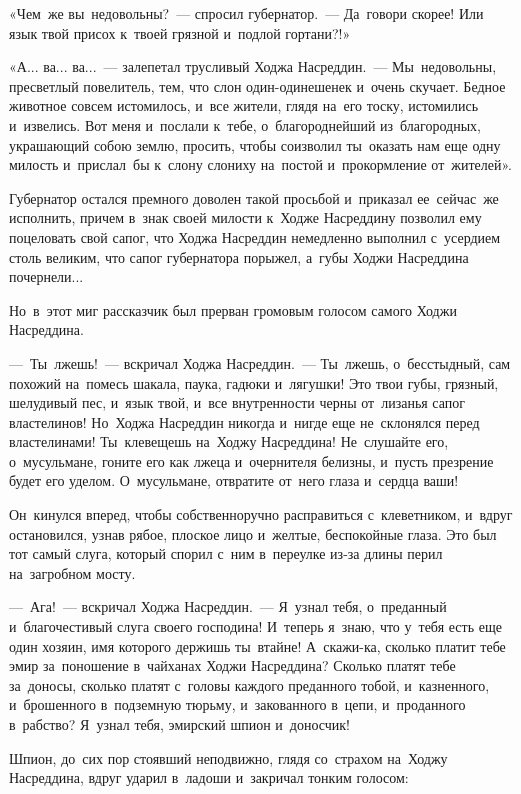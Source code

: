 \documentclass[12pt,a4paper]{book}
\begin{document}
«Чем~же вы~недовольны?~— спросил губернатор.~— Да~говори скорее! Или язык твой присох к~твоей грязной и~подлой гортани?!»

«А... ва... ва...~— залепетал трусливый Ходжа Насреддин.~— Мы~недовольны, пресветлый повелитель, тем, что слон один-одинешенек и~очень скучает. Бедное животное совсем истомилось, и~все жители, глядя на~его тоску, истомились и~извелись. Вот меня и~послали к~тебе, о~благороднейший из~благородных, украшающий собою землю, просить, чтобы соизволил ты~оказать нам еще одну милость и~прислал~бы к~слону слониху на~постой и~прокормление от~жителей».

Губернатор остался премного доволен такой просьбой и~приказал ее~сейчас~же исполнить, причем в~знак своей милости к~Ходже Насреддину позволил ему поцеловать свой сапог, что Ходжа Насреддин немедленно выполнил с~усердием столь великим, что сапог губернатора порыжел, а~губы Ходжи Насреддина почернели...

Но~в~этот миг рассказчик был прерван громовым голосом самого Ходжи Насреддина.

—~Ты~лжешь!~— вскричал Ходжа Насреддин.~— Ты~лжешь, о~бесстыдный, сам похожий на~помесь шакала, паука, гадюки и~лягушки! Это твои губы, грязный, шелудивый пес, и~язык твой, и~все внутренности черны от~лизанья сапог властелинов! Но~Ходжа Насреддин никогда и~нигде еще не~склонялся перед властелинами! Ты~клевещешь на~Ходжу Насреддина! Не~слушайте его, о~мусульмане, гоните его как лжеца и~очернителя белизны, и~пусть презрение будет его уделом. О~мусульмане, отвратите от~него глаза и~сердца ваши!

Он~кинулся вперед, чтобы собственноручно расправиться с~клеветником, и~вдруг остановился, узнав рябое, плоское лицо и~желтые, беспокойные глаза. Это был тот самый слуга, который спорил с~ним в~переулке из-за длины перил на~загробном мосту.

—~Ага!~— вскричал Ходжа Насреддин.~— Я~узнал тебя, о~преданный и~благочестивый слуга своего господина! И~теперь я~знаю, что у~тебя есть еще один хозяин, имя которого держишь ты~втайне! А~скажи-ка, сколько платит тебе эмир за~поношение в~чайханах Ходжи Насреддина? Сколько платят тебе за~доносы, сколько платят с~головы каждого преданного тобой, и~казненного, и~брошенного в~подземную тюрьму, и~закованного в~цепи, и~проданного в~рабство? Я~узнал тебя, эмирский шпион и~доносчик!

Шпион, до~сих пор стоявший неподвижно, глядя со~страхом на~Ходжу Насреддина, вдруг ударил в~ладоши и~закричал тонким голосом:
\end{document}

